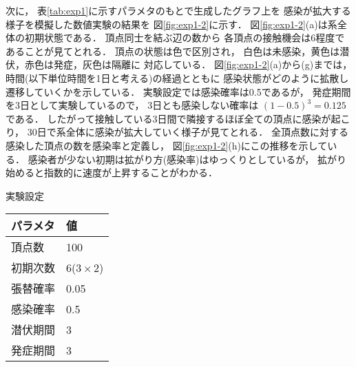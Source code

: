 \documentclass[10pt,oneside]{scrartcl}
\begin{document}
\begin{figure}[htbp]
  \centering
  \setcounter{GraphPage}{8}
  \setcounter{GraphPage}{13}
  \setcounter{GraphPage}{18}
  \setcounter{GraphPage}{23}
  \setcounter{GraphPage}{28}
  \setcounter{GraphPage}{33}
\end{figure}

次に，
表\ref{tab:exp1}に示すパラメタのもとで生成したグラフ上を
感染が拡大する様子を模擬した数値実験の結果を
図\ref{fig:exp1-2}に示す．
図\ref{fig:exp1-2}(a)は系全体の初期状態である．
頂点同士を結ぶ辺の数から
各頂点の接触機会は6程度であることが見てとれる．
頂点の状態は色で区別され，
白色は未感染，黄色は潜伏，赤色は発症，灰色は隔離に
対応している．
図\ref{fig:exp1-2}(a)から(g)までは，
時間(以下単位時間を1日と考える)の経過とともに
感染状態がどのように拡散し遷移していくかを示している．
実験設定では感染確率は0.5であるが，
発症期間を3日として実験しているので，
3日とも感染しない確率は \((1-0.5)^3=0.125\) である．
したがって接触している3日間で隣接するほぼ全ての頂点に感染が起こり，
30日で系全体に感染が拡大していく様子が見てとれる．
全頂点数に対する感染した頂点の数を感染率と定義し，
図\ref{fig:exp1-2}(h)にこの推移を示している．
感染者が少ない初期は拡がり方(感染率)はゆっくりとしているが，
拡がり始めると指数的に速度が上昇することがわかる．

\begin{margintable}
  \caption{実験設定}
  \label{tab:exp1}
  \small
  \begin{tabular}{ll}
    \toprule
    パラメタ&値 \\
    \midrule
    頂点数&100 \\
    初期次数&6\;($3\times2$) \\
    張替確率&0.05 \\
    感染確率&0.5 \\
    潜伏期間&3 \\
    発症期間&3 \\
    \bottomrule
  \end{tabular}
\end{margintable}
\end{document}
